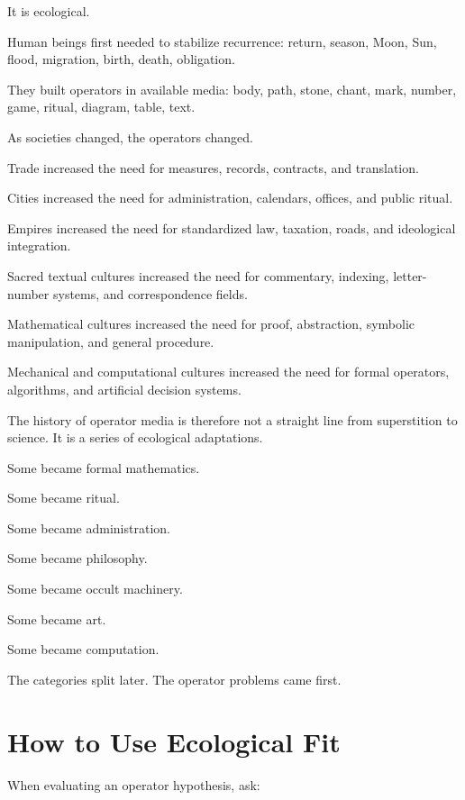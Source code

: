 \documentclass[11pt]{book}
\begin{document}
It is ecological.

Human beings first needed to stabilize recurrence: return, season, Moon, Sun, flood, migration, birth, death, obligation.

They built operators in available media: body, path, stone, chant, mark, number, game, ritual, diagram, table, text.

As societies changed, the operators changed.

Trade increased the need for measures, records, contracts, and translation.

Cities increased the need for administration, calendars, offices, and public ritual.

Empires increased the need for standardized law, taxation, roads, and ideological integration.

Sacred textual cultures increased the need for commentary, indexing, letter-number systems, and correspondence fields.

Mathematical cultures increased the need for proof, abstraction, symbolic manipulation, and general procedure.

Mechanical and computational cultures increased the need for formal operators, algorithms, and artificial decision systems.

The history of operator media is therefore not a straight line from superstition to science. It is a series of ecological adaptations.

Some became formal mathematics.

Some became ritual.

Some became administration.

Some became philosophy.

Some became occult machinery.

Some became art.

Some became computation.

The categories split later. The operator problems came first.

\section{How to Use Ecological Fit}

When evaluating an operator hypothesis, ask:
\end{document}
